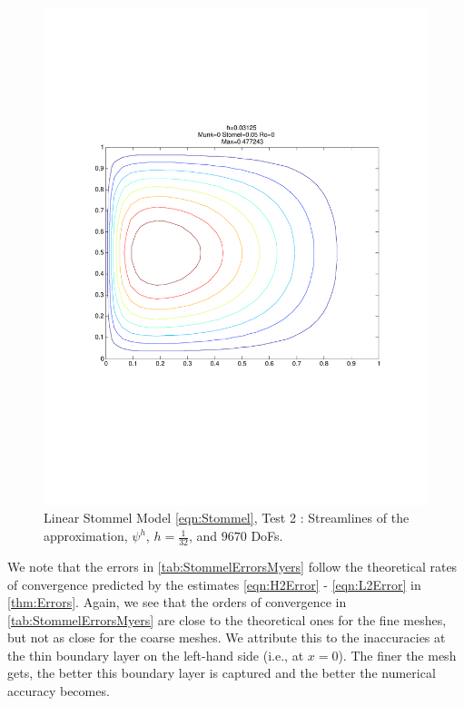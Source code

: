 \begin{figure}%
  \begin{center}
    \includegraphics[trim=0 200 20 220, clip=true, scale=0.5]{LinearStommelMyers.pdf}
    \caption{Linear Stommel Model \eqref{eqn:Stommel}, Test 2 \cite{Myers}: Streamlines of the approximation,
    $\psi^h$, $h=\frac{1}{32}$, and $9670$ DoFs.}
    \label{fig:StommelMyers}
  \end{center}
\end{figure}

We note that the errors in \autoref{tab:StommelErrorsMyers} follow the
theoretical rates of convergence predicted by the estimates \eqref{eqn:H2Error}
- \eqref{eqn:L2Error} in \autoref{thm:Errors}. Again, we see that the orders of
convergence in \autoref{tab:StommelErrorsMyers} are close to the theoretical
ones for the fine meshes, but not as close for the coarse meshes. We attribute
this to the inaccuracies at the thin boundary layer on the left-hand side (i.e.,
at $x=0$). The finer the mesh gets, the better this boundary layer is captured
and the better the numerical accuracy becomes.

